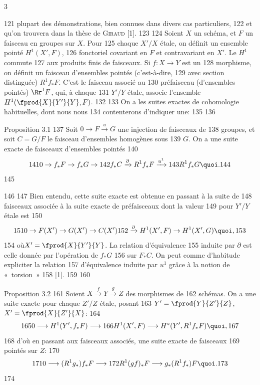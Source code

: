 3	\documentclass[10pt]{../fichiers-configuration-latex/smfart}
\begin{document}
   121	plupart des démonstrations, bien connues dans divers cas particuliers,
   122	et qu'on trouvera dans la thèse de \textsc{Giraud} [1].
   123	
   124	Soient $X$ un schéma, et $F$ un faisceau en groupes sur $X$. Pour
   125	chaque $X'/X$ étale, on définit un ensemble pointé $H^1(X',F)$,
   126	fonctoriel covariant en $F$ et contravariant en $X'$. Le $H^1$ commute
   127	aux produits finis de faisceaux. Si $f:X\rightarrow Y$ est un
   128	morphisme, on définit un faisceau d'ensembles pointés (c'est-à-dire,
   129	avec section distinguée) $R^1f_{\ast}F$. C'est le faisceau associé au
   130	préfaisceau (d'ensembles pointés) $\Rr^1F$, qui, à chaque
   131	$Y'/Y$ étale, associe l'ensemble $H^1(\fprod{X}{Y'}{Y},F)$.
   132	
   133	On a les suites exactes de cohomologie habituelles, dont nous nous
   134	contenterons d'indiquer une:
   135	
   136	\begin{enonce*}{Proposition 3.1}
   137	Soit $0\rightarrow F\xrightarrow{u} G$ une injection de faisceaux de
   138	groupes, et soit $C=G/F$ le faisceau d'ensembles homogènes sous
   139	$G$. On a une suite exacte de faisceaux d'ensembles pointés
   140	$$
   141	0\rightarrow f_{\ast}F\rightarrow f_{\ast}G\rightarrow
   142	f_{\ast}C\xrightarrow{\partial} R^1f_{\ast}F\xrightarrow{u^1}
   143	R^1f_{\ast}G{\quoi}.
   144	$$
   145	\end{enonce*}
   146	
   147	Bien entendu, cette suite exacte est obtenue en passant à la suite de
   148	faisceaux associée à la suite exacte de préfaisceaux dont la valeur
   149	pour $Y'/Y$ étale est
   150	$$
   151	0\rightarrow F(X')\rightarrow G(X')\rightarrow C(X')
   152	\xrightarrow{\partial} H^1(X',F)\rightarrow H^1(X',G){\quoi},
   153	$$
   154	où\pageoriginale $X'=\fprod{X}{Y'}{Y}$. La relation d'équivalence
   155	induite par $\partial$ est celle donnée par l'opération de $f_{\ast}G$
   156	sur $F_{\ast}C$. On peut comme d'habitude expliciter la relation
   157	d'équivalence induite par $u^1$ grâce à la notion de « torsion » 
   158	[1].
   159	
   160	\begin{enonce*}{Proposition 3.2}
   161	Soient $X\xrightarrow{f}Y\xrightarrow{g}Z$ des morphismes de
   162	schémas. On a une suite exacte pour chaque $Z'/Z$ étale, posant
   163	$Y'=\fprod{Y}{Z'}{Z}$, $X'=\fprod{X}{Z'}{X}$:
   164	$$
   165	0\longrightarrow H^1(Y',f_{\ast}F)\longrightarrow
   166	H^1(X',F)\longrightarrow H^{\circ}(Y',R^1f_{\ast}F){\quoi},
   167	$$
   168	d'où en passant aux faisceaux associés, une suite exacte de faisceaux
   169	pointés sur $Z$:
   170	$$
   171	0\longrightarrow (R^1g_{\ast})f_{\ast}F\longrightarrow
   172	R^1(gf)_{\ast}F\longrightarrow g_{\ast}(R^1f_{\ast})F{\quoi}.
   173	$$
   174	\end{enonce*}
\end{document}

